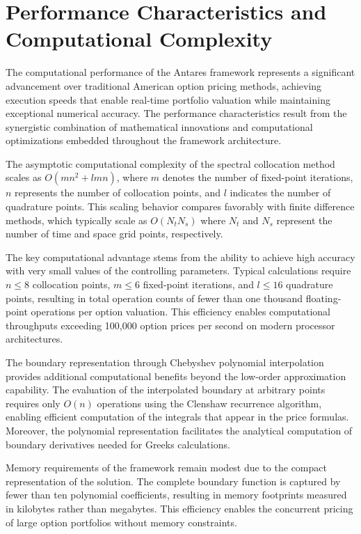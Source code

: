 \documentclass[
  american,
  11pt,
  11pt,
  letterpaper,
  onecolumn]{article}
\begin{document}
\section{Performance Characteristics and Computational
Complexity}\label{performance-characteristics-and-computational-complexity}

The computational performance of the Antares framework represents a
significant advancement over traditional American option pricing
methods, achieving execution speeds that enable real-time portfolio
valuation while maintaining exceptional numerical accuracy. The
performance characteristics result from the synergistic combination of
mathematical innovations and computational optimizations embedded
throughout the framework architecture.

The asymptotic computational complexity of the spectral collocation
method scales as \(O(mn^2 + lmn)\), where \(m\) denotes the number of
fixed-point iterations, \(n\) represents the number of collocation
points, and \(l\) indicates the number of quadrature points. This
scaling behavior compares favorably with finite difference methods,
which typically scale as \(O(N_t N_s)\) where \(N_t\) and \(N_s\)
represent the number of time and space grid points, respectively.

The key computational advantage stems from the ability to achieve high
accuracy with very small values of the controlling parameters. Typical
calculations require \(n \leq 8\) collocation points, \(m \leq 6\)
fixed-point iterations, and \(l \leq 16\) quadrature points, resulting
in total operation counts of fewer than one thousand floating-point
operations per option valuation. This efficiency enables computational
throughputs exceeding 100,000 option prices per second on modern
processor architectures.

The boundary representation through Chebyshev polynomial interpolation
provides additional computational benefits beyond the low-order
approximation capability. The evaluation of the interpolated boundary at
arbitrary points requires only \(O(n)\) operations using the Clenshaw
recurrence algorithm, enabling efficient computation of the integrals
that appear in the price formulas. Moreover, the polynomial
representation facilitates the analytical computation of boundary
derivatives needed for Greeks calculations.

Memory requirements of the framework remain modest due to the compact
representation of the solution. The complete boundary function is
captured by fewer than ten polynomial coefficients, resulting in memory
footprints measured in kilobytes rather than megabytes. This efficiency
enables the concurrent pricing of large option portfolios without memory
constraints.
\end{document}
